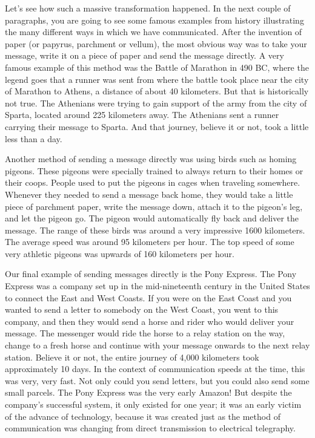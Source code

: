 Let's see how such a massive transformation happened.
In the next couple of paragraphs, you are going to see some famous examples from history illustrating the many different ways in which we have communicated.
After the invention of paper (or papyrus, parchment or vellum), the most obvious way was to take your message, write it on a piece of paper and send the message directly.
A very famous example of this method was the Battle of Marathon in 490 BC, where the legend goes that a runner was sent from where the battle took place near the city of Marathon to Athens, a distance of about 40 kilometers.
But that is historically not true.
The Athenians were trying to gain support of the army from the city of Sparta, located around 225 kilometers away.
The Athenians sent a runner carrying their message to Sparta.
And that journey, believe it or not, took a little less than a day.

Another method of sending a message directly was using birds such as homing pigeons.
These pigeons were specially trained to always return to their homes or their coops. People used to put the pigeons in cages when traveling somewhere. Whenever they needed to send a message back home, they would take a little piece of parchment paper, write the message down, attach it to the pigeon's leg, and let the pigeon go. The pigeon would automatically fly back and deliver the message.
The range of these birds was around a very impressive 1600 kilometers.
The average speed was around 95 kilometers per hour.
The top speed of some very athletic pigeons was upwards of 160 kilometers per hour.

Our final example of sending messages directly is the Pony Express.
The Pony Express was a company set up in the mid-nineteenth century in the United States to connect the East and West Coasts.
If you were on the East Coast and you wanted to send a letter to somebody on the West Coast, you went to this company, and then they would send a horse and rider who would deliver your message.
The messenger would ride the horse to a relay station on the way, change to a fresh horse and continue with your message onwards to the next relay station.
Believe it or not, the entire journey of 4,000 kilometers took approximately 10 days.
In the context of communication speeds at the time, this was very, very fast.
Not only could you send letters, but you could also send some small parcels.
The Pony Express was the very early Amazon!
But despite the company's successful system, it only existed for one year; it was an early victim of the advance of technology, because it was created just as the method of communication was changing from direct transmission to electrical telegraphy.

